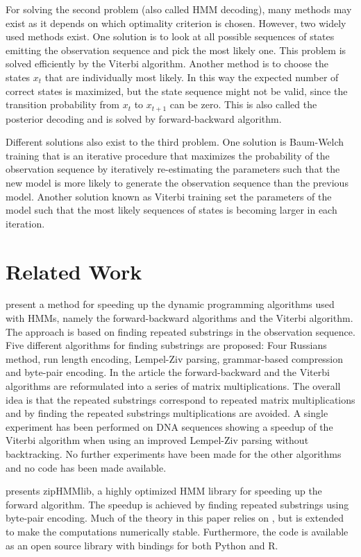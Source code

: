 For solving the second problem (also called HMM decoding), many
methods may exist as it depends on which optimality criterion is chosen.
However, two widely used methods exist. One solution is to look at all possible
sequences of states emitting the observation sequence and pick the most likely
one. This problem is solved efficiently by the Viterbi algorithm. Another
method is to choose the states $x_t$ that are individually most likely. In this
way the expected number of correct states is maximized, but the state sequence
might not be valid, since the transition probability from $x_t$ to $x_{t + 1}$
can be zero. This is also called the posterior decoding and is solved by
forward-backward algorithm.

Different solutions also exist to the third problem. One solution is Baum-Welch
training that is an iterative procedure that maximizes the probability of the
observation sequence by iteratively re-estimating the parameters such that the
new model is more likely to generate the observation sequence than the previous
model. Another solution known as Viterbi training set the parameters of the
model such that the most likely sequences of states is becoming larger in each
iteration.

\section{Related Work}

\citet{lifshits2009speeding} present a method for speeding up the dynamic
programming algorithms used with HMMs, namely the forward-backward algorithms
and the Viterbi algorithm. The approach is based on finding repeated substrings
in the observation sequence. Five different algorithms for finding
substrings are proposed: Four Russians method, run length encoding, Lempel-Ziv
parsing, grammar-based compression and byte-pair encoding. In the article the
forward-backward and the Viterbi algorithms are reformulated into a series of
matrix multiplications. The overall idea is that the repeated substrings
correspond to repeated matrix multiplications and by finding the repeated
substrings multiplications are avoided. A single experiment has been
performed on DNA sequences showing a speedup of the Viterbi algorithm when
using an improved Lempel-Ziv parsing without backtracking. No further
experiments have been made for the other algorithms and no code has been made
available.

\citet{sand2013ziphmmlib} presents zipHMMlib, a highly optimized HMM library for
speeding up the forward algorithm. The speedup is achieved by finding repeated
substrings using byte-pair encoding. Much of the theory in this paper relies on
\cite{lifshits2009speeding}, but is extended to make the computations
numerically stable. Furthermore, the code is available as an open source
library with bindings for both Python and R.

